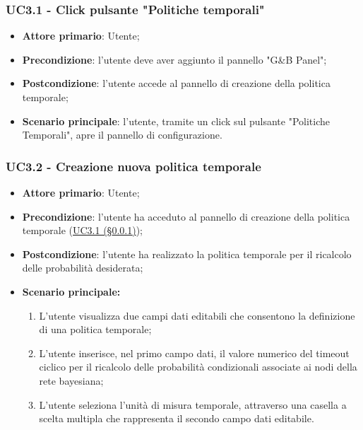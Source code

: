 \subsubsection{UC3.1 - Click pulsante "Politiche temporali"}\label{UC3.1}
\begin{itemize}
	\item \textbf{Attore primario}: Utente; 
	\item \textbf{Precondizione}: l'utente deve aver aggiunto il pannello "G\&B Panel";
	\item \textbf{Postcondizione}: l'utente accede al pannello di creazione della politica temporale;
	\item \textbf{Scenario principale}: l'utente, tramite un click sul pulsante "Politiche Temporali", apre il pannello di configurazione. 
\end{itemize}

\subsubsection{UC3.2 - Creazione nuova politica temporale}\label{UC3.2}

\begin{itemize}
	\item \textbf{Attore primario}: Utente; 
	\item \textbf{Precondizione}: l'utente ha acceduto al pannello di creazione della politica temporale (\hyperref[UC3.1]{UC3.1 (§\ref*{UC3.1})});
	\item \textbf{Postcondizione}: l'utente ha realizzato la politica temporale per il ricalcolo delle probabilità desiderata;
	\item \textbf{Scenario principale:}
	\begin{enumerate}
		\item L'utente visualizza due campi dati editabili che consentono la definizione di una politica temporale;
		\item L'utente inserisce, nel primo campo dati, il valore numerico del timeout ciclico per il ricalcolo delle probabilità condizionali associate ai nodi della rete bayesiana; 
		\item L'utente seleziona l'unità di misura temporale, attraverso una casella a scelta multipla che rappresenta il secondo campo dati editabile.
	\end{enumerate}
	
\end{itemize}

